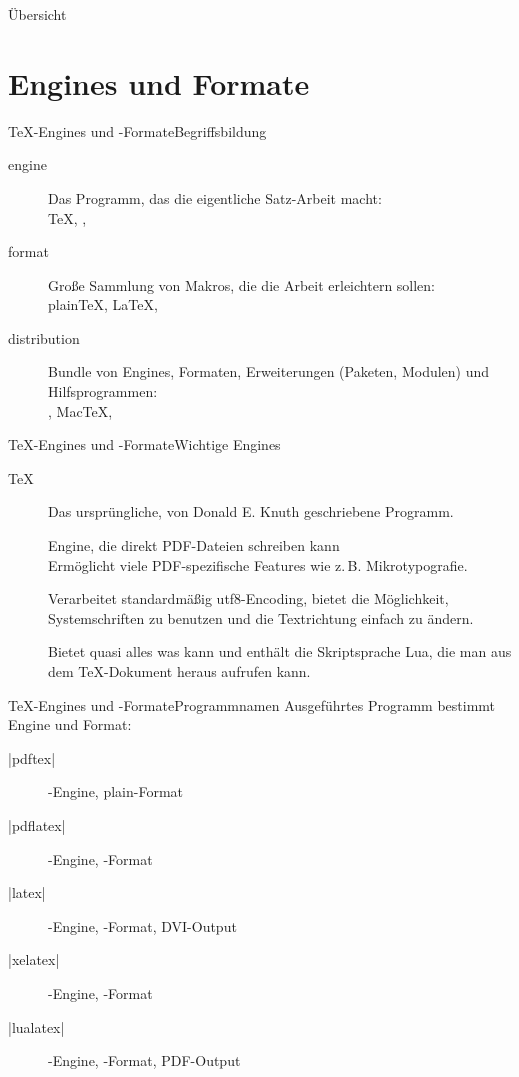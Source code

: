 \documentclass[
	vorläufig=true,
	datum=2016-10-28,
	titel={Allgemeine Formatierung und Pakete},
	web=false,
]{../tex/latexkurs-slides}
\begin{document}
\begin{frame}{Übersicht}
	\tableofcontents
\end{frame}

\section{Engines und Formate}
\begin{frame}{\TeX-Engines und -Formate}{Begriffsbildung}
	\begin{description}
		\item[engine] Das Programm, das die eigentliche Satz-Arbeit macht:\\\TeX, , \luaTeX
		\item[format] Große Sammlung von Makros, die die Arbeit erleichtern sollen:\\plain\TeX, \LaTeX, 
		\item[distribution] Bundle von Engines, Formaten, Erweiterungen (Paketen, Modulen) und Hilfsprogrammen:\\\TeXlive, Mac\TeX, \MikTeX
	\end{description}
\end{frame}

\begin{frame}{\TeX-Engines und -Formate}{Wichtige Engines}
	\begin{description}
		\item[\TeX] Das ursprüngliche, von Donald E. Knuth geschriebene Programm.
		\item[] Engine, die direkt PDF-Dateien schreiben kann\\Ermöglicht viele PDF-spezifische Features wie z.\,B. Mikrotypografie.
		\item[\XeTeX] Verarbeitet standardmäßig utf8-Encoding, bietet die Möglichkeit, Systemschriften zu benutzen und die Textrichtung einfach zu ändern.
		\item[\luaTeX] Bietet quasi alles was \XeTeX kann und enthält die Skriptsprache Lua, die man aus dem \TeX-Dokument heraus aufrufen kann.
	\end{description}
\end{frame}

\begin{frame}[fragile]{\TeX-Engines und -Formate}{Programm\/namen}
	Ausgeführtes Programm bestimmt Engine und Format:\\[1em]
	\begin{description}
		\item[|pdftex|] -Engine, plain-Format
		\item[|pdflatex|] -Engine, \LaTeXe-Format
		\item[|latex|] -Engine, \LaTeXe-Format, DVI-Output
		\item[|xelatex|] \XeTeX-Engine, \LaTeXe-Format
		\item[|lualatex|] \luaTeX-Engine, \LaTeXe-Format, PDF-Output
	\end{description}
\end{frame}
\end{document}
